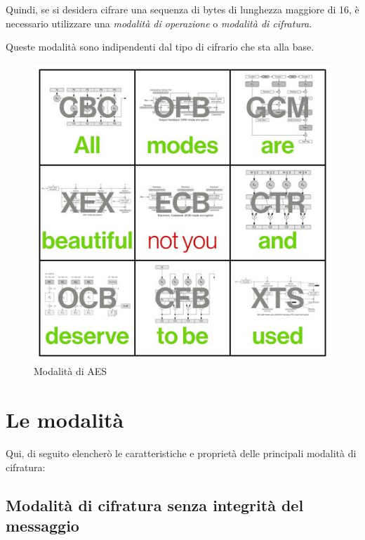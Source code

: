 
\textsf{\small Quindi, se si desidera cifrare una sequenza di bytes di lunghezza maggiore di 16, è necessario utilizzare una \emph{modalità di operazione} o \emph{modalità di cifratura}.} %


\textsf{\small Queste modalità sono indipendenti dal tipo di cifrario che sta alla base.} %

\begin{figure}[H]
	\centering
	\includegraphics[width=.8\textwidth, height=.8\textheight, keepaspectratio]{./images/aes_modes/modes.png} %
	\caption{Modalità di AES}
	\label{fig:aes_modes}
\end{figure}


\section{Le modalità}

 

\textsf{\small Qui, di seguito elencherò le caratteristiche e proprietà delle principali modalità di cifratura:}

\subsection{Modalità di cifratura senza integrità del messaggio}

